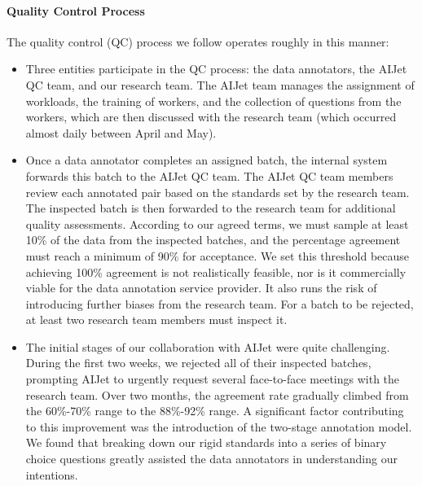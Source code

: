 \paragraph{Quality Control Process} The quality control (QC) process we follow operates roughly in this manner:
\begin{itemize}[leftmargin=*]
    \item Three entities participate in the QC process: the data annotators, the AIJet QC team, and our research team. The AIJet team manages the assignment of workloads, the training of workers, and the collection of questions from the workers, which are then discussed with the research team (which occurred almost daily between April and May).
    \item Once a data annotator completes an assigned batch, the internal system forwards this batch to the AIJet QC team. The AIJet QC team members review each annotated pair based on the standards set by the research team. The inspected batch is then forwarded to the research team for additional quality assessments. According to our agreed terms, we must sample at least 10\% of the data from the inspected batches, and the percentage agreement must reach a minimum of 90\% for acceptance. We set this threshold because achieving 100\% agreement is not realistically feasible, nor is it commercially viable for the data annotation service provider. It also runs the risk of introducing further biases from the research team. For a batch to be rejected, at least two research team members must inspect it.
    \item The initial stages of our collaboration with AIJet were quite challenging. During the first two weeks, we rejected all of their inspected batches, prompting AIJet to urgently request several face-to-face meetings with the research team. Over two months, the agreement rate gradually climbed from the 60\%-70\% range to the 88\%-92\% range. A significant factor contributing to this improvement was the introduction of the two-stage annotation model. We found that breaking down our rigid standards into a series of binary choice questions greatly assisted the data annotators in understanding our intentions.
\end{itemize}



